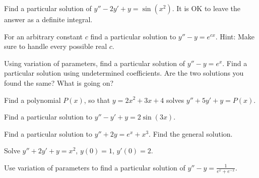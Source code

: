 \begin{exercise}
Find a particular solution of
$y''-2y' +y = \sin (x^2)$.  It is OK to leave the answer as a definite
integral.
\end{exercise}

\begin{exercise}
For an arbitrary constant $c$ find a particular solution
to $y''-y=e^{cx}$.  Hint: Make sure to handle every possible real $c$.
\end{exercise}

\begin{exercise} \label{exercise:diffvarparunder}
\pagebreak[2]
\leavevmode
\begin{tasks}
\task Using variation of parameters, find a particular solution of
$y''-y = e^x$.
\task Find a particular solution using undetermined
coefficients.
\task Are the two solutions you found the same?
What is going on?
\end{tasks}
\end{exercise}

\begin{exercise}
Find a polynomial $P(x)$, so that
$y = 2 x^2 + 3 x + 4$
solves
$y''+5 y'+ y = P(x)$.
\end{exercise}

\setcounter{exercise}{100}

\begin{exercise}
Find a particular solution to $y''-y'+y=2\sin(3x)$.
\end{exercise}

\begin{samepage}
\begin{exercise}
\leavevmode
\begin{tasks}
\task Find a particular solution to $y''+2y=e^x + x^3$.
\task Find the general solution.
\end{tasks}
\end{exercise}
\end{samepage}

\begin{exercise}
Solve $y''+2y'+y = x^2$, $y(0)=1$, $y'(0)=2$.
\end{exercise}

\begin{exercise}
Use variation of parameters to
find a particular solution of $y''-y = \frac{1}{e^x+e^{-x}}$.
\end{exercise}

